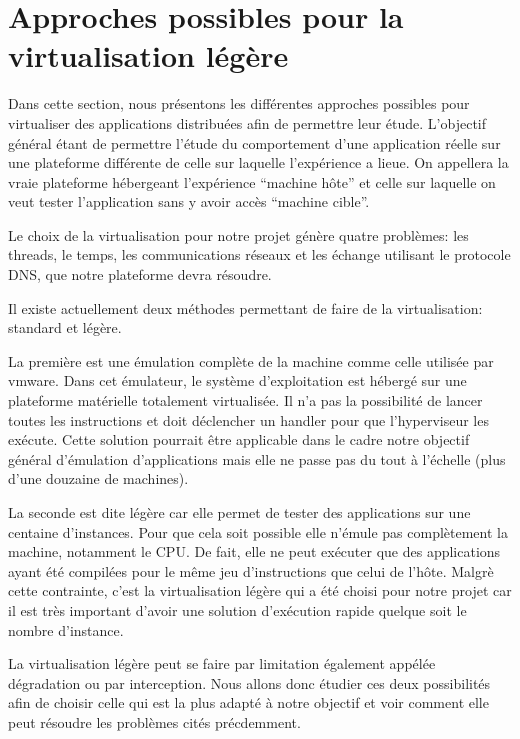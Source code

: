 \section{Approches possibles pour la virtualisation légère}
\label{section:emulation}

Dans cette section, nous présentons les différentes approches possibles pour
virtualiser des applications distribuées afin de permettre leur
étude. L'objectif général étant de permettre l'étude du comportement d'une
application réelle sur une plateforme différente de celle sur laquelle
l'expérience a lieue. On appellera la vraie plateforme hébergeant l'expérience
``machine hôte'' et celle sur laquelle on veut tester l'application sans y avoir
accès ``machine cible''.

Le choix de la virtualisation pour notre projet génère quatre problèmes: les
threads, le temps, les communications réseaux et les échange utilisant le
protocole DNS, que notre plateforme devra résoudre.

Il existe actuellement deux méthodes permettant de faire de la virtualisation:
standard et légère.

La première est une émulation complète de la machine comme celle utilisée par
vmware. Dans cet émulateur, le système d'exploitation est hébergé sur une
plateforme matérielle totalement virtualisée. Il n'a pas la possibilité de
lancer toutes les instructions et doit déclencher un handler pour que
l'hyperviseur les exécute. Cette solution pourrait être applicable dans le cadre
notre objectif général d'émulation d'applications mais elle ne passe pas du tout
à l'échelle (plus d'une douzaine de machines).

La seconde est dite légère car elle permet de tester des applications sur une
centaine d'instances. Pour que cela soit possible elle n'émule pas complètement
la machine, notamment le CPU. De fait, elle ne peut exécuter que des
applications ayant été compilées pour le même jeu d'instructions que celui de
l'hôte. Malgrè cette contrainte, c'est la virtualisation légère qui a été choisi
pour notre projet car il est très important d'avoir une solution d'exécution
rapide quelque soit le nombre d'instance.

La virtualisation légère peut se faire par limitation également appélée
dégradation ou par interception. Nous allons donc étudier ces deux possibilités
afin de choisir celle qui est la plus adapté à notre objectif et voir comment
elle peut résoudre les problèmes cités précdemment.









